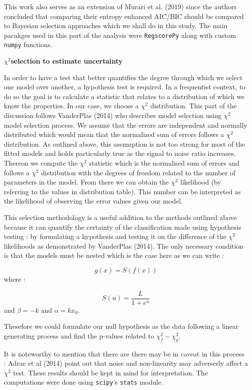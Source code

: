\documentclass[]{article}
\begin{document}
This work also serves as an extension of Murari et al. (2019) since the
authors concluded that comparing their entropy enhanced AIC/BIC should
be compared to Bayesian selection approaches which we shall do in this
study. The main pacakges used in this part of the analysis were
\texttt{RegscorePy} along with custom \texttt{numpy} functions.

\(\chi^2\)\textbf{selection to estimate uncertainty}

In order to have a test that better quantifies the degree through which
we select one model over another, a hypothesis test is required. In a
frequentist context, to do so the goal is to calculate a statistic that
relates to a distribution of which we know the properties. In our case,
we choose a \(\chi^2\) distribution. This part of the discussion follows
VanderPlas (2014) who describes model selection using \(\chi^2\) model
selection process. We assume that the errors are independent and
normally distributed which would mean that the normalized sum of errors
follows a \(\chi^2\) distribution. As outlined above, this assumption is
not too strong for most of the fitted models and holds particularly true
as the signal to noise ratio increases. Thereon we compute the
\(\chi^2\) statistic which is the normalised sum of errors and follows a
\(\chi^2\) distribution with the degrees of freedom related to the
number of parameters in the model. From there we can obtain the
\(\chi^2\) likelihood (by referring to the values in distribution
table). This number can be interpreted as the likelihood of observing
the error values given our model.

This selection methodology is a useful addition to the methods outlined
above because it can quantify the certainty of the classification made
using hypothesis testing : by formulating a hypothesis and testing it on
the difference of the \(\chi^2\) likelihoods as demonstrated by
VanderPlas (2014). The only necessary condition is that the models must
be nested which is the case here as we can write :

\[g(x) = S(f(x))\] where :

\[S(u) = \frac{L} {1+e^u}\] and \(\beta = -k\) and \(\alpha = kx_0\).

Thesefore we could formulate our null hypothesis as the data following a
linear generating process and find the p-values related to
\(\chi^2_f - \chi^2_g\).

It is noteworthy to mention that there are there may be in caveat in
this process : Adrae et al (2014) point out that noise and non-linearity
may adverserly affect a \(\chi^2\) test. These results should be kept in
mind for interpretation. The computations were done using
\texttt{scipy}'s \texttt{stats} module.
\end{document}

